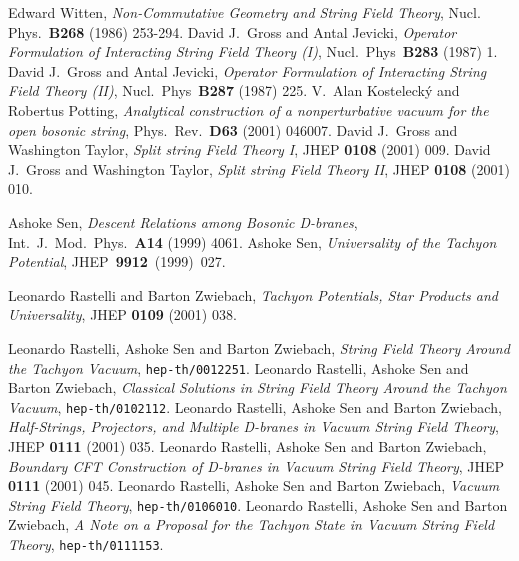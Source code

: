 \documentclass[letterpaper,12pt]{article}
\begin{document}
\begin{thebibliography}{99}

 Edward Witten, \emph{Non-Commutative Geometry and String Field Theory}, Nucl. Phys.~\textbf{B268} (1986) 253-294.
 David J.~Gross and Antal Jevicki, \emph{Operator Formulation of Interacting String Field Theory (I)}, Nucl.~Phys~\textbf{B283} (1987) 1.
 David J.~Gross and Antal Jevicki, \emph{Operator Formulation of Interacting String Field Theory (II)}, Nucl.~Phys~\textbf{B287} (1987) 225.
 V.~Alan Kosteleck\'y and Robertus Potting, \emph{Analytical construction of a nonperturbative vacuum for the open bosonic string}, Phys.~Rev.~\textbf{D63} (2001) 046007.
 David J.~Gross and Washington Taylor, \emph{Split string Field Theory I}, JHEP \textbf{0108} (2001) 009.
 David J.~Gross and Washington Taylor, \emph{Split string Field Theory II}, JHEP \textbf{0108} (2001) 010.

 Ashoke Sen, \emph{Descent Relations among Bosonic D-branes}, Int.~J.~Mod.~Phys.~\textbf{A14} (1999) 4061.
 Ashoke Sen, \emph{Universality of the Tachyon Potential},  JHEP~\textbf{9912}~(1999)~027. %

 Leonardo Rastelli and Barton Zwiebach, \emph{Tachyon Potentials, Star Products and Universality}, JHEP \textbf{0109} (2001) 038.

 Leonardo Rastelli, Ashoke Sen and Barton Zwiebach, \emph{String Field Theory Around the Tachyon Vacuum}, \texttt{hep-th/0012251}.
 Leonardo Rastelli, Ashoke Sen and Barton Zwiebach, \emph{Classical Solutions in String Field Theory Around the Tachyon Vacuum}, \texttt{hep-th/0102112}.
 Leonardo Rastelli, Ashoke Sen and Barton Zwiebach, \emph{Half-Strings, Projectors, and Multiple D-branes in Vacuum String Field Theory}, JHEP \textbf{0111} (2001) 035.
 Leonardo Rastelli, Ashoke Sen and Barton Zwiebach, \emph{Boundary CFT Construction of D-branes in Vacuum String Field Theory}, JHEP \textbf{0111} (2001) 045.
 Leonardo Rastelli, Ashoke Sen and Barton Zwiebach, \emph{Vacuum String Field Theory}, \texttt{hep-th/0106010}.
 Leonardo Rastelli, Ashoke Sen and Barton Zwiebach, \emph{A Note on a Proposal for the Tachyon State in Vacuum String Field Theory}, \texttt{hep-th/0111153}.


\end{thebibliography}
\end{document}
